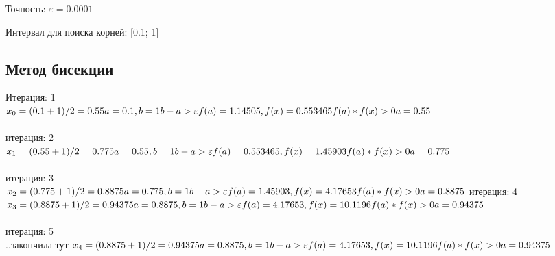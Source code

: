 \documentclass{article}
\begin{document}
Точность: $\varepsilon = 0.0001$

Интервал для поиска корней: [0.1; 1]

\subsection{Метод бисекции}
Итерация: 1 \\
\begin{math}
  x_{0}= (0.1+1)/2 = 0.55\\
  a=0.1, b=1\\
  b-a > \varepsilon \\
  f(a) = 1.14505, f(x) = 0.553465\\
  f(a) * f(x) > 0\\
  a = 0.55
\end{math}\\\\
итерация: 2\\
\begin{math}
  x_{1}= (0.55+1)/2 = 0.775\\
  a=0.55, b=1\\
  b-a > \varepsilon \\
  f(a) = 0.553465, f(x) = 1.45903\\
  f(a) * f(x) > 0\\
  a = 0.775
\end{math}\\\\
итерация: 3\\
\begin{math}
  x_{2}= (0.775+1)/2 = 0.8875\\
  a=0.775, b=1\\
  b-a > \varepsilon \\
  f(a) = 1.45903, f(x) = 4.17653\\
  f(a) * f(x) > 0\\
  a = 0.8875
\end{math}
итерация: 4
\begin{math}
  x_{3}= (0.8875+1)/2 = 0.94375\\
  a=0.8875, b=1\\
  b-a > \varepsilon \\
  f(a) = 4.17653, f(x) = 10.1196\\
  f(a) * f(x) > 0\\
  a = 0.94375
\end{math}\\\\
итерация: 5\\
..закончила тут
\begin{math}
  x_{4}= (0.8875+1)/2 = 0.94375\\
  a=0.8875, b=1\\
  b-a > \varepsilon \\
  f(a) = 4.17653, f(x) = 10.1196\\
  f(a) * f(x) > 0\\
  a = 0.94375
\end{math}\\\\
\end{document}

